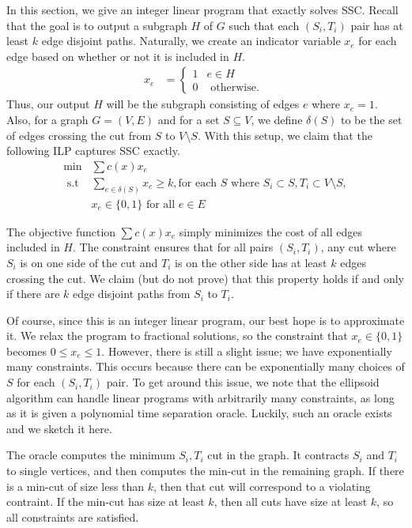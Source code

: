 \documentclass[12pt]{article}
\begin{document}
In this section, we give an integer linear program that exactly solves SSC. Recall that the goal is to output a subgraph $H$ of $G$ such that each $(S_i,T_i)$ pair has at least $k$ edge disjoint paths. Naturally, we create an indicator variable $x_e$ for each edge based on whether or not it is included in $H$. 
\begin{align}
 x_e &= \left\{ \begin{array}{cc} 1 & e \in H \\
                                  0 & \text{ otherwise. } \end{array} \right.
\end{align}
Thus, our output $H$ will be the subgraph consisting of edges $e$ where $x_e = 1$. Also, for a graph $G = (V,E)$ and for a set $S \subseteq V$, we define $\delta(S)$ to be the set of edges crossing the cut from $S$ to $V \setminus S$. 
With this setup, we claim that the following ILP captures SSC exactly. 
\begin{align}
\min & \sum c(x) x_e  \\
\text{ s.t } & \sum_{e \in \delta(S)} x_e \geq k, \text{for each }S\text{ where } S_i \subset S,T_i \subset V \setminus S,  \\
& x_e \in \{0,1\} \text{ for all }e \in E
\end{align}

The objective function $\sum c(x) x_e$ simply minimizes the cost of all edges included in $H$. The constraint ensures that for all pairs $(S_i,T_i)$, any cut where $S_i$ is on one side of the cut and $T_i$ is on the other side has at least $k$ edges crossing the cut. We claim (but do not prove) that this property holds if and only if there are $k$ edge disjoint paths from $S_i$ to $T_i$. 

Of course, since this is an integer linear program, our best hope is to approximate it. We relax the program to fractional solutions, so the constraint that $x_e \in \{0,1\}$ becomes $0 \leq x_e \leq 1$. However, there is still a slight issue; we have exponentially many constraints. This occurs because there can be exponentially many choices of $S$ for each $(S_i,T_i)$ pair. To get around this issue, we note that the ellipsoid algorithm can handle linear programs with arbitrarily many constraints, as long as it is given a polynomial time separation oracle. Luckily, such an oracle exists and we sketch it here.

The oracle computes the minimum $S_i, T_i$ cut in the graph. It contracts $S_i$ and $T_i$ to single vertices, and then computes the min-cut in the remaining graph. If there is a min-cut of size less than $k$, then that cut will correspond to a violating contraint. If the min-cut has size at least $k$, then all cuts have size at least $k$, so all constraints are satisfied.
\end{document}
